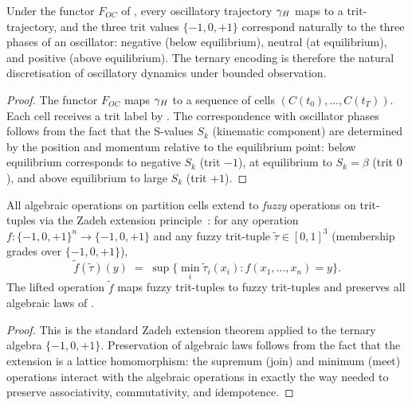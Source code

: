 \begin{proposition}
\label{prop:ternary-oscillatory}
Under the functor $F_{OC}$ of , every oscillatory
trajectory $\gamma_H$ maps to a trit-trajectory, and the three trit values
$\{-1, 0, +1\}$ correspond naturally to the three phases of an oscillator:
negative (below equilibrium), neutral (at equilibrium), and positive
(above equilibrium).  The ternary encoding is therefore the natural
discretisation of oscillatory dynamics under bounded observation.
\end{proposition}

\begin{proof}
The functor $F_{OC}$ maps $\gamma_H$ to a sequence of cells $(C(t_0), \ldots,
C(t_T))$.  Each cell receives a trit label by .
The correspondence with oscillator phases follows from the fact that the
S-values $S_k$ (kinematic component) are determined by the position and
momentum relative to the equilibrium point: below equilibrium corresponds to
negative $S_k$ (trit $-1$), at equilibrium to $S_k = \beta$ (trit $0$), and
above equilibrium to large $S_k$ (trit $+1$).
\end{proof}

\begin{theorem}
\label{thm:zadeh-extension}
All algebraic operations on partition cells extend to \emph{fuzzy} operations
on trit-tuples via the Zadeh extension principle~\citep{Zadeh1965,Zadeh1978}: for any operation
$f : \{-1, 0, +1\}^n \to \{-1, 0, +1\}$ and any fuzzy trit-tuple
$\tilde{\tau} \in [0,1]^3$ (membership grades over $\{-1, 0, +1\}$),
\[
  \widetilde{f}(\tilde{\tau})(y)
  \;=\; \sup \bigl\{ \min_i \tilde{\tau}_i(x_i) : f(x_1, \ldots, x_n) = y \bigr\} .
\]
The lifted operation $\widetilde{f}$ maps fuzzy trit-tuples to fuzzy trit-tuples
and preserves all algebraic laws of .
\end{theorem}

\begin{proof}
This is the standard Zadeh extension theorem applied to the ternary algebra
$\{-1, 0, +1\}$.  Preservation of algebraic laws follows from the fact that
the extension is a lattice homomorphism: the supremum (join) and minimum (meet)
operations interact with the algebraic operations in exactly the way needed to
preserve associativity, commutativity, and idempotence.
\end{proof}

